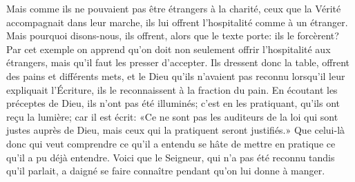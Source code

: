 Mais comme ils ne pouvaient pas être étrangers à la charité,
	ceux que la Vérité accompagnait dans leur marche,
	ils lui offrent l’hospitalité comme à un étranger.
Mais pourquoi disons-nous, ils offrent,
	alors que le texte porte: ils le forcèrent?
Par cet exemple
		on apprend qu’on doit non seulement offrir l’hospitalité aux étrangers,
	mais qu’il faut les presser d’accepter.
Ils dressent donc la table, offrent des pains et différents mets,
	et le Dieu qu’ils n’avaient pas reconnu
		lorsqu’il leur expliquait l’Écriture,
	ils le reconnaissent à la fraction du pain.
En écoutant les préceptes de Dieu, ils n’ont pas été illuminés;
	c’est en les pratiquant, qu’ils ont reçu la lumière;
	car il est écrit:
	«Ce ne sont pas les auditeurs de la loi qui sont justes auprès de Dieu,
	mais ceux qui la pratiquent seront justifiés.»
Que celui-là donc qui veut comprendre ce qu’il a entendu
	se hâte de mettre en pratique ce qu’il a pu déjà entendre.
Voici que le Seigneur, qui n’a pas été reconnu tandis qu’il parlait,
	a daigné se faire connaître pendant qu’on lui donne à manger.
